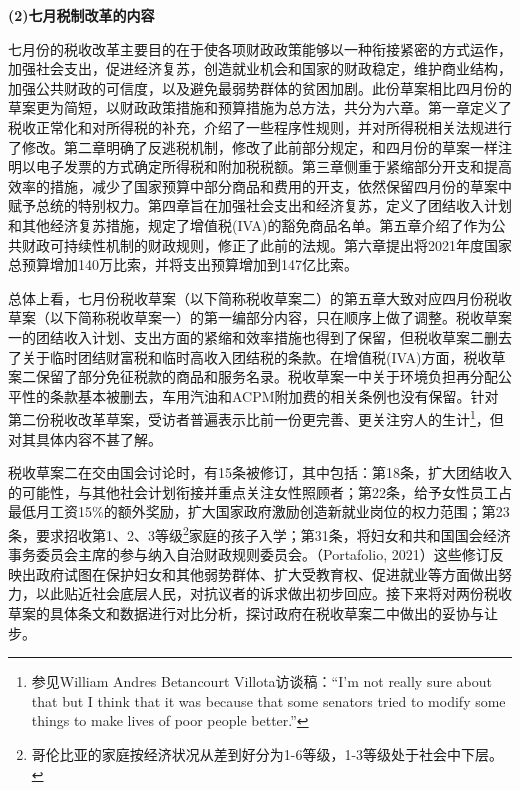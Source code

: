 \documentclass{phyasgn}\usepackage{nag}
\begin{document}
\par \textbf{(2)七月税制改革的内容}
\par 七月份的税收改革主要目的在于使各项财政政策能够以一种衔接紧密的方式运作，加强社会支出，促进经济复苏，创造就业机会和国家的财政稳定，维护商业结构，加强公共财政的可信度，以及避免最弱势群体的贫困加剧。此份草案相比四月份的草案更为简短，以财政政策措施和预算措施为总方法，共分为六章。第一章定义了税收正常化和对所得税的补充，介绍了一些程序性规则，并对所得税相关法规进行了修改。第二章明确了反逃税机制，修改了此前部分规定，和四月份的草案一样注明以电子发票的方式确定所得税和附加税税额。第三章侧重于紧缩部分开支和提高效率的措施，减少了国家预算中部分商品和费用的开支，依然保留四月份的草案中赋予总统的特别权力。第四章旨在加强社会支出和经济复苏，定义了团结收入计划和其他经济复苏措施，规定了增值税(IVA)的豁免商品名单。第五章介绍了作为公共财政可持续性机制的财政规则，修正了此前的法规。第六章提出将2021年度国家总预算增加140万比索，并将支出预算增加到147亿比索。
\par 总体上看，七月份税收草案（以下简称税收草案二）的第五章大致对应四月份税收草案（以下简称税收草案一）的第一编部分内容，只在顺序上做了调整。税收草案一的团结收入计划、支出方面的紧缩和效率措施也得到了保留，但税收草案二删去了关于临时团结财富税和临时高收入团结税的条款。在增值税(IVA)方面，税收草案二保留了部分免征税款的商品和服务名录。税收草案一中关于环境负担再分配公平性的条款基本被删去，车用汽油和ACPM附加费的相关条例也没有保留。针对第二份税收改革草案，受访者普遍表示比前一份更完善、更关注穷人的生计\footnote[21]{参见William Andres Betancourt Villota访谈稿：“I’m not really sure about that but I think that it was because that some senators tried to modify some things to make lives of poor people better.”}，但对其具体内容不甚了解。
\par 税收草案二在交由国会讨论时，有15条被修订，其中包括：第18条，扩大团结收入的可能性，与其他社会计划衔接并重点关注女性照顾者；第22条，给予女性员工占最低月工资15\%的额外奖励，扩大国家政府激励创造新就业岗位的权力范围；第23条，要求招收第1、2、3等级\footnote[22]{哥伦比亚的家庭按经济状况从差到好分为1-6等级，1-3等级处于社会中下层。}家庭的孩子入学；第31条，将妇女和共和国国会经济事务委员会主席的参与纳入自治财政规则委员会。（Portafolio, 2021）这些修订反映出政府试图在保护妇女和其他弱势群体、扩大受教育权、促进就业等方面做出努力，以此贴近社会底层人民，对抗议者的诉求做出初步回应。接下来将对两份税收草案的具体条文和数据进行对比分析，探讨政府在税收草案二中做出的妥协与让步。
\end{document}
